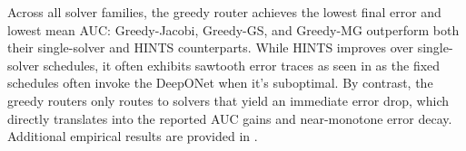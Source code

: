 \documentclass{article} %
\begin{document}
Across all solver families, the greedy router achieves the lowest final error and lowest mean AUC: Greedy-Jacobi, Greedy-GS, and Greedy-MG outperform both their single-solver and HINTS counterparts. While HINTS improves over single-solver schedules, it often exhibits sawtooth error traces as seen in  as the fixed schedules often invoke the DeepONet when it's suboptimal. By contrast, the greedy routers only routes to solvers that yield an immediate error drop, which directly translates into the reported AUC gains and near-monotone error decay. Additional empirical results are provided in .
\begin{table}[]
    \centering
\end{table}
\end{document}
